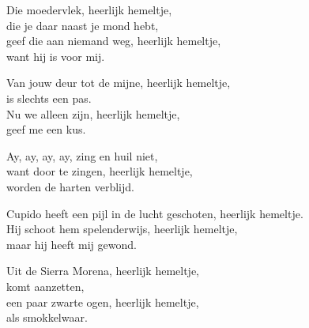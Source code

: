 \clearpage
\begin{translation}
Die moedervlek, heerlijk hemeltje,\\
die je daar naast je mond hebt,\\
geef die aan niemand weg, heerlijk hemeltje,\\
want hij is voor mij.\vspace{\wlskip}

Van jouw deur tot de mijne, heerlijk hemeltje,\\
is slechts een pas.\\
Nu we alleen zijn, heerlijk hemeltje,\\
geef me een kus.\vspace{\wlskip}

Ay, ay, ay, ay, zing en huil niet,\\
want door te zingen, heerlijk hemeltje,\\
worden de harten verblijd.\vspace{\wlskip}

Cupido heeft een pijl in de lucht geschoten, heerlijk hemeltje.\\
Hij schoot hem spelenderwijs, heerlijk hemeltje,\\
maar hij heeft mij gewond.\vspace{\wlskip}

Uit de Sierra Morena, heerlijk hemeltje,\\
komt aanzetten,\\
een paar zwarte ogen, heerlijk hemeltje,\\
als smokkelwaar.\\
\end{translation}
